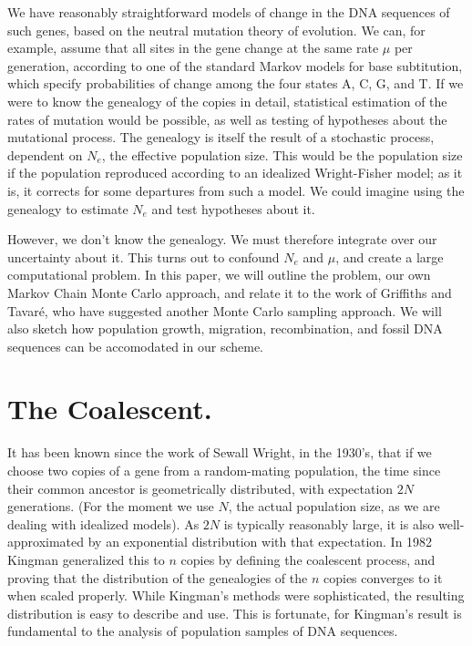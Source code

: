 We have reasonably straightforward models of change in the DNA sequences
of such genes, based on the neutral mutation theory of evolution.  We can,
for example, assume that all sites in the gene change at the same rate $\mu$
per generation,
according to one of the standard Markov models for base subtitution, which
specify probabilities of change among the four states A, C, G, and T.  If
we were to know the genealogy of the copies in detail, statistical estimation
of the rates of mutation would be possible, as well as testing of
hypotheses about the mutational process.  The genealogy is itself the
result of a stochastic process, dependent on $N_e$, the effective population
size.  This would be the population size if the population reproduced
according to an idealized Wright-Fisher model; as it is, it corrects for
some departures from such a model.  We could imagine using the genealogy
to estimate $N_e$ and test hypotheses about it.

However, we don't know the genealogy.  We must therefore integrate over our
uncertainty about it.  This turns out to confound $N_e$ and $\mu$, and
create a large computational problem.  In this paper, we will outline
the problem, our own Markov Chain Monte Carlo approach, and relate it to the
work of Griffiths and Tavar\'e, who have suggested another Monte Carlo
sampling approach.  We will also sketch how population growth, migration,
recombination, and fossil DNA sequences can be accomodated in our scheme.

\section{The Coalescent.}

It has been known since the work of Sewall Wright, in the 1930's, that
if we choose two copies of a gene from a random-mating population, the
time since their common ancestor is geometrically distributed, with expectation
$2N$ generations. (For the moment we use $N$, the actual population size, as
we are dealing with idealized models).  As $2N$ is typically reasonably large, it is also
well-approximated by an exponential distribution with that expectation.
In 1982 Kingman \cite{Kingman82a, Kingman82b, Kingman82c} generalized this to $n$ copies by defining the
coalescent process, and proving that the distribution of the genealogies
of the $n$ copies converges to it when scaled properly.  While Kingman's
methods were sophisticated, the resulting distribution is easy to
describe and use.  This is fortunate, for Kingman's result is fundamental to
the analysis of population samples of DNA sequences.

